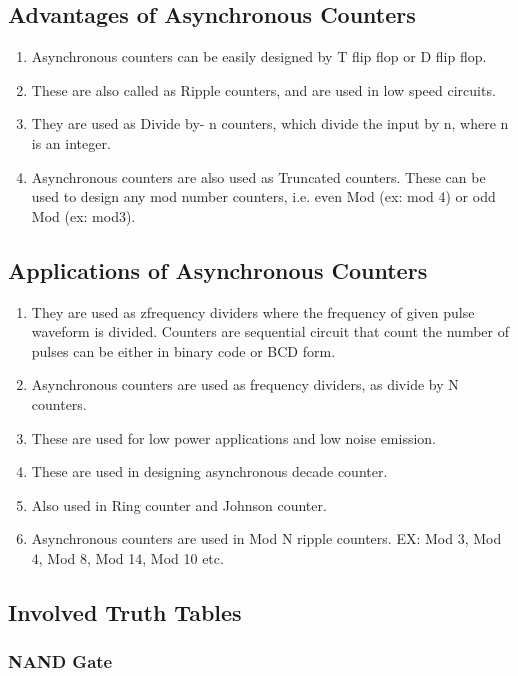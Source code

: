 \documentclass[11pt]{article}
\begin{document}
\subsection{Advantages of Asynchronous Counters}
\begin{enumerate}
	\item Asynchronous counters can be easily designed by T flip flop or D flip flop.
	\item These are also called as Ripple counters, and are used in low speed circuits.
	\item They are used as Divide by- n counters, which divide the input by n, where n is an integer.
	\item Asynchronous counters are also used as Truncated counters. These can be used to design any mod number counters, i.e. even Mod (ex: mod 4) or odd Mod (ex: mod3).
\end{enumerate}
\subsection{Applications of Asynchronous Counters}
\begin{enumerate}
	\item They are used as zfrequency dividers where the frequency of given pulse waveform is divided. Counters are sequential circuit that count the number of pulses can be either in binary code or BCD form.
	\item Asynchronous counters are used as frequency dividers, as divide by N counters.
	\item These are used for low power applications and low noise emission.
	\item These are used in designing asynchronous decade counter.
	\item Also used in Ring counter and Johnson counter.
	\item Asynchronous counters are used in Mod N ripple counters. EX: Mod 3, Mod 4, Mod 8, Mod 14, Mod 10 etc.
\end{enumerate}
\subsection{Involved Truth Tables}

\subsubsection{NAND Gate}
\end{document}
